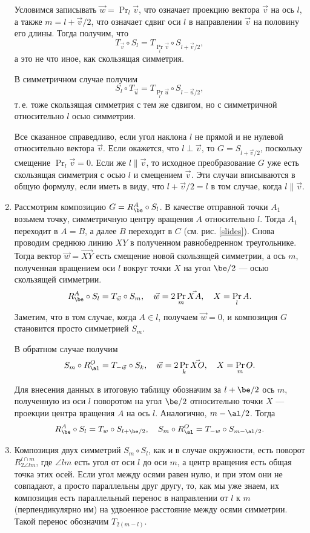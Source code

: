 \begin{enumerate}
Условимся записывать $\vec w=\Pr_l\vec v$, что означает проекцию вектора $\vec v$ на ось $l$, а также $m=l+\vec v/2$, что означает сдвиг оси $l$ в направлении $\vec v$ на половину его длины. Тогда получим, что
$$
T_{\vec v}\circ S_l = T_{\Pr_l\vec v}\circ S_{l+\vec v/2},
$$
а это не что иное, как скользящая симметрия.

В симметричном случае получим
$$
S_l\circ T_{\vec u} = T_{\Pr_l\vec u}\circ S_{l-\vec u/2},
$$
т.\,е. тоже скользящая симметрия с тем же сдвигом, но с симметричной относительно $l$ осью симметрии.

Все сказанное справедливо, если угол наклона $l$ не прямой и не нулевой относительно вектора $\vec v$. Если окажется, что $l\perp\vec v$, то $G=S_{l+\vec v/2}$, поскольку смещение $\Pr_l\vec v=0$. Если же $l\parallel\vec v$, то исходное преобразование $G$ уже есть скользящая симметрия с осью $l$ и смещением $\vec v$. Эти случаи вписываются в общую формулу, если иметь в виду, что $l+\vec v/2=l$ в том случае, когда $l\parallel\vec v$.

\item Рассмотрим композицию $G=R_\be^A\circ S_l$. В качестве отправной точки $A_1$ возьмем точку, симметричную центру вращения $A$ относительно $l$. Тогда $A_1$ переходит в $A=B$, а далее $B$ переходит в $C$ (см. рис. \ref{slides}). Снова проводим среднюю линию $XY$ в полученном равнобедренном треугольнике. Тогда вектор $\vec w = \vec{XY}$ есть смещение новой скользящей симметрии, а ось $m$, полученная вращением оси $l$ вокруг точки $X$ на угол $\be/2$ --- осью скользящей симметрии.
$$
R_\be^A\circ S_l = T_{\vec w}\circ S_m,\quad \vec w  = 2 \Pr_m\vec{XA},\quad X = \Pr_lA.
$$
Заметим, что в том случае, когда $A\in l$, получаем $\vec w=0$, и композиция $G$ становится просто симметрией $S_m$.

В обратном случае получим
$$
S_m\circ R_\al^O = T_{-\vec w}\circ S_k,\quad \vec w  = 2 \Pr_k\vec{XO},\quad X = \Pr_mO.
$$

Для внесения данных в итоговую таблицу обозначим за $l+\be/2$ ось $m$, полученную из оси $l$ поворотом на угол $\be/2$ относительно точки $X$ --- проекции центра вращения $A$ на ось $l$. Аналогично, $m-\al/2$. Тогда
$$
R_\be^A\circ S_l = T_w\circ S_{l+\be/2},\quad S_m\circ R_\al^O = T_{-w}\circ S_{m-\al/2}.
$$

\item Композиция двух симметрий $S_m\circ S_l$, как и в случае окружности, есть поворот $R_{2\angle lm}^{l\cap m}$, где $\angle lm$ есть угол от оси $l$ до оси $m$, а центр вращения есть общая точка этих осей. Если угол между осями равен нулю, и при этом они не совпадают, а просто параллельны друг другу, то, как мы уже знаем, их композиция есть параллельный перенос в направлении от $l$ к $m$ (перпендикулярно им) на удвоенное расстояние между осями симметрии. Такой перенос обозначим $T_{2(m-l)}$.


\end{enumerate}
